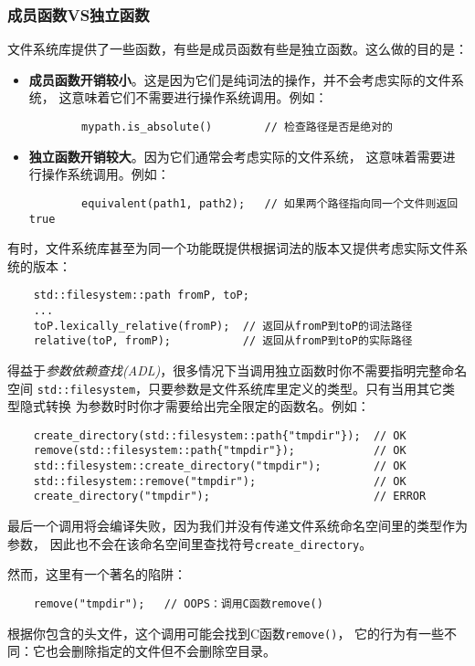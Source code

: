 \subsubsection{成员函数VS独立函数}
文件系统库提供了一些函数，有些是成员函数有些是独立函数。这么做的目的是：
\begin{itemize}[leftmargin=*]
    \item \textbf{成员函数开销较小}。这是因为它们是纯词法的操作，并不会考虑实际的文件系统，
    这意味着它们不需要进行操作系统调用。例如：
    \begin{lstlisting}
        mypath.is_absolute()        // 检查路径是否是绝对的
    \end{lstlisting}
    \item \textbf{独立函数开销较大}。因为它们通常会考虑实际的文件系统，
    这意味着需要进行操作系统调用。例如：
    \begin{lstlisting}
        equivalent(path1, path2);   // 如果两个路径指向同一个文件则返回true
    \end{lstlisting}
\end{itemize}
有时，文件系统库甚至为同一个功能既提供根据词法的版本又提供考虑实际文件系统的版本：
\begin{lstlisting}
    std::filesystem::path fromP, toP;
    ...
    toP.lexically_relative(fromP);  // 返回从fromP到toP的词法路径
    relative(toP, fromP);           // 返回从fromP到toP的实际路径
\end{lstlisting}
得益于\emph{参数依赖查找(ADL)}，很多情况下当调用独立函数时你不需要指明完整命名空间
\texttt{std::filesystem}，只要参数是文件系统库里定义的类型。只有当用其它类型隐式转换
为参数时时你才需要给出完全限定的函数名。例如：\label{ADL导致意外行为}
\begin{lstlisting}
    create_directory(std::filesystem::path{"tmpdir"});  // OK
    remove(std::filesystem::path{"tmpdir"});            // OK
    std::filesystem::create_directory("tmpdir");        // OK
    std::filesystem::remove("tmpdir");                  // OK
    create_directory("tmpdir");                         // ERROR
\end{lstlisting}
最后一个调用将会编译失败，因为我们并没有传递文件系统命名空间里的类型作为参数，
因此也不会在该命名空间里查找符号\texttt{create\_directory}。

然而，这里有一个著名的陷阱：
\begin{lstlisting}
    remove("tmpdir");   // OOPS：调用C函数remove()
\end{lstlisting}
根据你包含的头文件，这个调用可能会找到C函数\texttt{remove()}，
它的行为有一些不同：它也会删除指定的文件但不会删除空目录。

